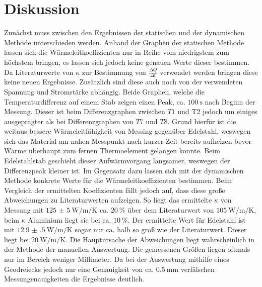 
\section{Diskussion}
\label{sec:Diskussion}
Zunächst muss zwischen den Ergebnissen der statischen und der dynamischen Methode
 unterschieden werden. Anhand der Graphen der statischen Methode lassen sich
 die Wärmeleitkoeffizienten nur in Reihe vom niedrigstem zum höchstem bringen,
 es lassen sich jedoch keine genauen Werte dieser bestimmen. Da Literaturwerte
 von $\kappa$ zur Bestimmung von $\frac{\Delta Q}{\Delta t}$ verwendet werden
 bringen diese keine neuen Ergebnisse. Zusätzlich sind diese auch noch von der
 verwendeten Spannung und Stromstärke abhängig. Beide Graphen, welche die
 Temperaturdifferenz auf einem Stab zeigen einen Peak,
 ca. $\SI{100}{\second}$ nach Beginn der Messung. Dieser ist beim
 Differenzgraphen zwischen $T1$ und T2 jedoch um einiges ausgeprägter als bei
 Differenzgraphen von $T7$ und $T8$. Grund hierfür ist die weitaus bessere
 Wärmeleitfähigkeit von Messing gegenüber Edelstahl, weswegen sich das
 Material am nahen Messpunkt nach kurzer Zeit bereits aufheizen bevor Wärme
 überhaupt zum fernen Thermoelement gelangen konnte. Beim Edelstahlstab geschieht
 dieser Aufwärmvorgang langsamer, weswegen der Differenzpeak kleiner ist. Im
 Gegensatz dazu lassen sich mit der dynamischen Methode konkrete Werte für die
 Wärmeleitkoeffizienten bestimmen. Beim Vergleich der ermittelten Koeffizienten
  fällt jedoch auf, dass diese große Abweichungen zu Literaturwerten aufzeigen.
  So liegt das ermittelte $\kappa$ von Messung mit
  $\SI{125(5)}{\watt\per\meter\per\kelvin}$ ca. $\SI{20}{\percent}$ über
  dem Literaturwert von $\SI{105}{\watt\per\meter\per\kelvin}$, beim $\kappa$
  Aluminium liegt sie bei ca. $\SI{10}{\percent}$. Der ermittelte Wert für
  Edelstahl ist mit $\SI{12.9(5)}{\watt\per\meter\per\kelvin}$ sogar
   nur ca. halb so groß wie der Literaturwert. Dieser liegt bei $\SI{20}{\watt\per\meter\per\kelvin}$.
   Die Hauptursache der Abweichungen liegt wahrscheinlich in der Methode der manuellen
   Auswertung. Die gemessenen Größen liegen oftmals nur im Bereich weniger Millimeter.
   Da bei der Auswertung mithilfe eines Geodreiecks jedoch nur eine
   Genauigkeit von ca. $\SI{0.5}{\milli\meter}$ verfälschen
   Messungenauigkeiten die Ergebnisse deutlich.
